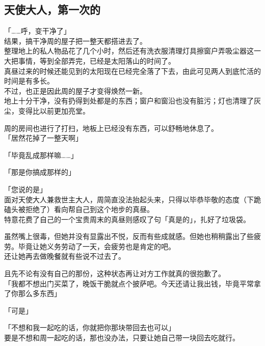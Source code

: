 \subsection{天使大人，第一次的}

「……呼，变干净了」\\

结果，搞干净周的屋子把一整天都搭进去了。\\

整理地上的私人物品花了几个小时，然后还有洗衣服清理灯具擦窗户弄吸尘器这一大把事情，等到全部弄完，已经是太阳落山的时间了。\\

真昼过来的时候还能见到的太阳现在已经完全落了下去，由此可见两人到底忙活的时间是有多长。\\

不过，也正是因此周的屋子才变得焕然一新。\\

地上十分干净，没有扔得到处都是的东西；窗户和窗沿也没有脏污；灯也清理了灰尘，变得比以前更加亮堂。

周的房间也进行了打扫，地板上已经没有东西，可以舒畅地休息了。\\

「居然花掉了一整天啊」

「毕竟乱成那样嘛……」

「那是你搞成那样的」

「您说的是」\\

面对天使大人兼救世主大人，周简直没法抬起头来，只得以毕恭毕敬的态度（下跪磕头被拒绝了）看向帮自己到这个地步的真昼。\\

特意花费了自己的一个宝贵周末的真昼则感叹了句「真是的」，扎好了垃圾袋。

虽然嘴上很毒，但她并没有显露出不悦，反而有些成就感。但她也稍稍露出了些疲劳。毕竟让她义务劳动了一天，会疲劳也是肯定的吧。\\

还让她再去做晚餐就有些说不过去了。

且先不论有没有自己的那份，这种状态再让对方工作就真的很抱歉了。\\

「我都不想出门买菜了，晚饭干脆就点个披萨吧。今天还请让我出钱，毕竟平常拿了你那么多东西」

「可是」

「不想和我一起吃的话，你就把你那块带回去也可以」\\

要是不想和周一起吃的话，那也没办法，只要让她自己带一块回去吃就行。

